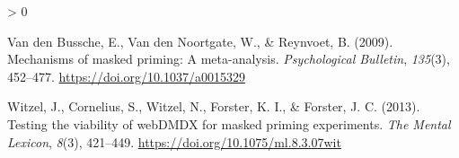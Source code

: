 \documentclass[
  english,
  man]{apa6}
\newlength{\cslhangindent}
\newenvironment{CSLReferences}[2] %
 {%
  \setlength{\parindent}{0pt}
  \ifodd #1 \everypar{\setlength{\hangindent}{\cslhangindent}}\ignorespaces\fi
  \ifnum #2 > 0
  \setlength{\parskip}{#2\baselineskip}
  \fi
 }%
 {}
\begin{document}
\begin{CSLReferences}{1}{0}
\leavevmode\hypertarget{ref-vandenbusscheMechanismsMaskedPriming2009}{}%
Van den Bussche, E., Van den Noortgate, W., \& Reynvoet, B. (2009). Mechanisms of masked priming: {A} meta-analysis. \emph{Psychological Bulletin}, \emph{135}(3), 452--477. \url{https://doi.org/10.1037/a0015329}

\leavevmode\hypertarget{ref-witzelTestingViabilityWebDMDX2013}{}%
Witzel, J., Cornelius, S., Witzel, N., Forster, K. I., \& Forster, J. C. (2013). Testing the viability of {webDMDX} for masked priming experiments. \emph{The Mental Lexicon}, \emph{8}(3), 421--449. \url{https://doi.org/10.1075/ml.8.3.07wit}

\end{CSLReferences}

\endgroup
\end{document}
